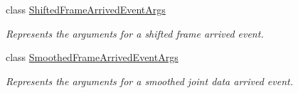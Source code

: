 \begin{DoxyCompactItemize}
class \hyperlink{class_rowing_monitor_1_1_model_1_1_shifted_frame_arrived_event_args}{Shifted\+Frame\+Arrived\+Event\+Args}
\begin{DoxyCompactList}\small\item\em Represents the arguments for a shifted frame arrived event. \end{DoxyCompactList}\item 
class \hyperlink{class_rowing_monitor_1_1_model_1_1_smoothed_frame_arrived_event_args}{Smoothed\+Frame\+Arrived\+Event\+Args}
\begin{DoxyCompactList}\small\item\em Represents the arguments for a smoothed joint data arrived event. \end{DoxyCompactList}\end{DoxyCompactItemize}
